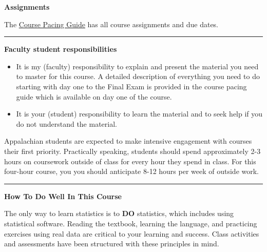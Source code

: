 \documentclass[
]{article}
\begin{document}
\textbf{Assignments}

The \href{../CoursePacing/CoursePacingF2024H.html}{Course Pacing Guide}
has all course assignments and due dates.

\begin{center}\rule{0.5\linewidth}{0.5pt}\end{center}

\begin{rmdnote}
\textbf{Faculty student responsibilities}

\begin{itemize}
\item
  It is my (faculty) responsibility to explain and present the material
  you need to master for this course. A detailed description of
  everything you need to do starting with day one to the Final Exam is
  provided in the course pacing guide which is available on day one of
  the course.
\item
  It is your (student) responsibility to learn the material and to seek
  help if you do not understand the material.
\end{itemize}
\end{rmdnote}

Appalachian students are expected to make intensive engagement with
courses their first priority. Practically speaking, students should
spend approximately 2-3 hours on coursework outside of class for every
hour they spend in class. For this four-hour course, you you should
anticipate 8-12 hours per week of outside work.

\begin{center}\rule{0.5\linewidth}{0.5pt}\end{center}

\textbf{How To Do Well In This Course}

The only way to learn statistics is to \textbf{DO} statistics, which
includes using statistical software. Reading the textbook, learning the
language, and practicing exercises using real data are critical to your
learning and success. Class activities and assessments have been
structured with these principles in mind.
\end{document}
